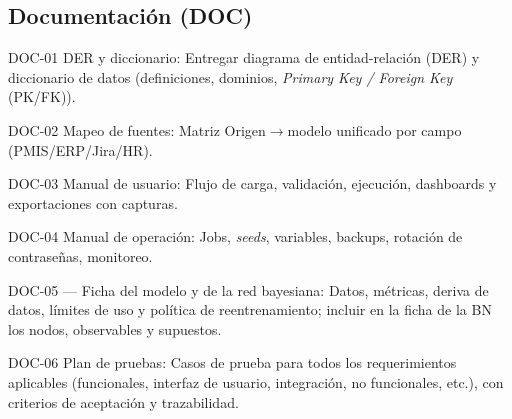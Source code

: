 \documentclass[12pt]
{charter}
\begin{document}
\subsection{Documentación (DOC)}
\begin{description}
  \item DOC-01 DER y diccionario: Entregar diagrama de entidad-relación (DER) y diccionario de datos (definiciones, dominios, \textit{Primary Key / Foreign Key} (PK/FK)).

  \item DOC-02 Mapeo de fuentes: Matriz Origen$\rightarrow$modelo unificado por campo (PMIS/ERP/Jira/HR).

  \item DOC-03 Manual de usuario: Flujo de carga, validación, ejecución, dashboards y exportaciones con capturas.

  \item DOC-04 Manual de operación: Jobs, \textit{seeds}, variables, backups, rotación de contraseñas, monitoreo.

  \item DOC-05 — Ficha del modelo y de la red bayesiana: Datos, métricas, deriva de datos, límites de uso y política de reentrenamiento; incluir en la ficha de la BN los nodos, observables y supuestos.

  \item DOC-06 Plan de pruebas: Casos de prueba para todos los requerimientos aplicables (funcionales, interfaz de usuario, integración, no funcionales, etc.), con criterios de aceptación y trazabilidad.

\end{description}
\end{document}
